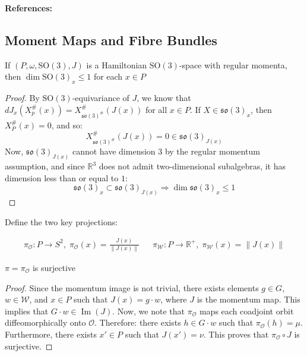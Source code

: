\noindent \textbf{References:} \textcite{Blaom1996}

\subsection{Moment Maps and Fibre Bundles}
\begin{theorem}\label{thm:stabilizer-dimension}
If $(P, \omega, \mathrm{SO}(3), J)$ is a Hamiltonian $\mathrm{SO}(3)$-space with regular momenta, then $\dim \mathrm{SO}(3)_{x} \leq 1$ for each $x \in P$
\end{theorem}
\begin{proof}
By $\mathrm{SO}(3)$-equivariance of $J$, we know that $dJ_{x}(X_{p}^{\#}(x)) = X^{\#}_{\mathfrak{so}(3)^{\#}}(J(x))$ for all $x \in P$. If $X \in \mathfrak{so}(3)_{x}$, then $X_{P}^{\#}(x) = 0$, and so:
\begin{equation}
X^{\#}_{\mathfrak{so}(3)^{\#}}(J(x)) = 0 \in \mathfrak{so}(3)_{J(x)}
\end{equation}
Now, $\mathfrak{so}(3)_{J(x)}$ cannot have dimension $3$ by the regular momentum assumption, and since $\mathbb{R}^{3}$ does not admit two-dimensional subalgebras, it has dimension less than or equal to $1$:
\begin{equation}
\mathfrak{so}(3)_{x} \subset \mathfrak{so}(3)_{J(x)} \Rightarrow \dim \mathfrak{so}(3)_{x} \leq 1
\end{equation}
\end{proof}

Define the two key projections:

\begin{align}
\pi_{\mathcal{O}}: P \to S^{2}, \; \pi_{\mathcal{O}}(x) = \frac{J(x)}{\|J(x)\|} && \pi_{\mathcal{W}}: P \to \mathbb{R}^{+}, \; \pi_{\mathcal{W}}(x) = \|J(x)\|
\end{align}

\begin{lemma}
$\pi = \pi_{\mathcal{O}}$ is surjective
\end{lemma}

\begin{proof}
Since the momentum image is not trivial, there exists elements $g \in G$, $w \in \mathcal{W}$, and $x \in P$ such that $J(x) = g \cdot w$, where $J$ is the momentum map. This implies that $G \cdot w \in \operatorname{Im}(J)$. Now, we note that $\pi_{\mathcal{O}}$ maps each coadjoint orbit diffeomorphically onto $\mathcal{O}$. Therefore: there exists $h \in G \cdot w$ such that $\pi_{\mathcal{O}} (h) = \mu$. Furthermore, there exists $x' \in P$ such that $J(x') = \nu$. This proves that $\pi_{\mathcal{O}} \circ J$ is surjective.
\end{proof}

